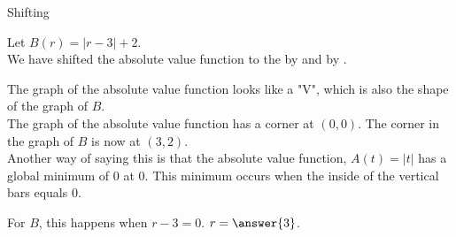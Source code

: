 \documentclass{ximera}
\begin{document}
\begin{example}  Shifting

Let $B(r) = |r-3| + 2$.  \\


We have shifted the absolute value function to the  by  and   by .


\begin{image}
\end{image}

\end{example}


The graph of the absolute value function looks like a "V", which is also the shape of the graph of $B$. \\


The graph of the absolute value function has a corner at $(0, 0)$.  The corner in the graph of $B$ is now at $(3, 2)$. \\

Another way of saying this is that the absolute value function, $A(t) = |t|$ has a global minimum of $0$ at $0$.  This minimum occurs when the inside of the vertical bars equals $0$.

For $B$, this happens when $r-3=0$. $r=\answer{3}$.
\end{document}
